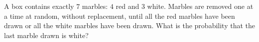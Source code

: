 A box contains exactly $7$ marbles: $4$ red and $3$ white. Marbles are removed one at a time at random, without replacement, until all the red marbles have been drawn or all the white marbles have been drawn. What is the probability that the last marble drawn is white?
